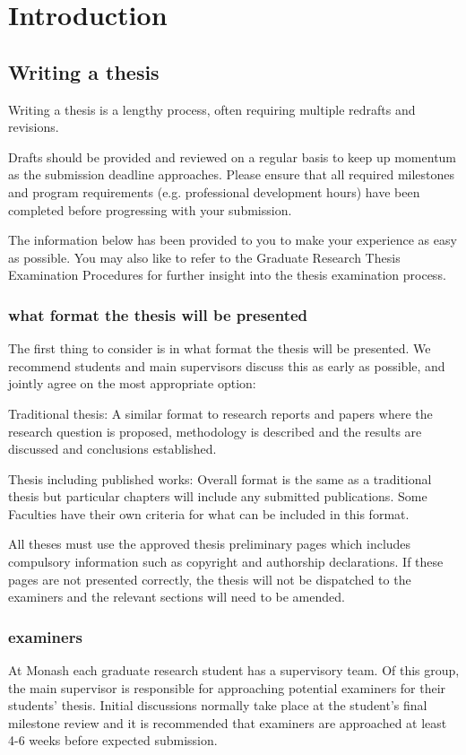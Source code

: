 \chapter{Introduction}
\label{cp.intro}

\section{Writing a thesis}
Writing a thesis is a lengthy process, often requiring multiple redrafts and revisions.

Drafts should be provided and reviewed on a regular basis to keep up momentum as the submission deadline approaches. Please ensure that all required milestones and program requirements (e.g. professional development hours) have been completed before progressing with your submission.

The information below has been provided to you to make your experience as easy as possible. You may also like to refer to the Graduate Research Thesis Examination Procedures for further insight into the thesis examination process.

\subsection{what format the thesis will be presented}
The first thing to consider is in what format the thesis will be presented.
We recommend students and main supervisors discuss this as early as possible, and jointly agree on the most appropriate option:

Traditional thesis: A similar format to research reports and papers where the research question is proposed, methodology is described and the results are discussed and conclusions established.

Thesis including published works: Overall format is the same as a traditional thesis but particular chapters will include any submitted publications. Some Faculties have their own criteria for what can be included in this format.

All theses must use the approved thesis preliminary pages which includes compulsory information such as copyright and authorship declarations. If these pages are not presented correctly, the thesis will not be dispatched to the examiners and the relevant sections will need to be amended.

\subsection{examiners}
At Monash each graduate research student has a supervisory team. Of this group, the main supervisor is responsible for approaching potential examiners for their students' thesis. Initial discussions normally take place at the student’s final milestone review and it is recommended that examiners are approached at least 4-6 weeks before expected submission.

